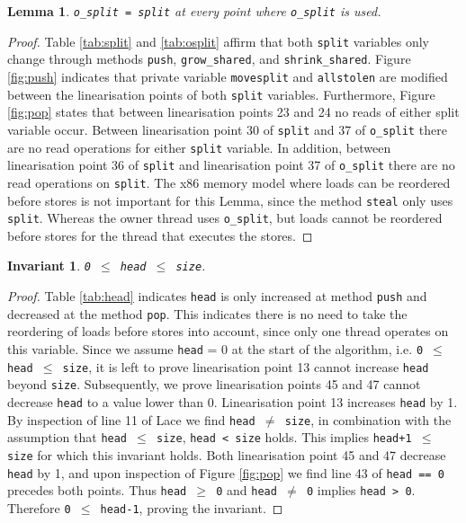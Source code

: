 \documentclass{sig-alternate-br}
\newtheorem{lemma}{Lemma}
\newtheorem{invariant}{Invariant}
\begin{document}
\begin{lemma}
	\texttt{o\_split = split} at every point where \texttt{o\_split} is used.
	\label{lem:split}
\end{lemma}
\begin{proof}
	Table \ref{tab:split} and \ref{tab:osplit} affirm that both \texttt{split} variables only change through methods \texttt{push}, \texttt{grow\_shared}, and \texttt{shrink\_shared}.
	Figure \ref{fig:push} indicates that private variable \texttt{movesplit} and \texttt{allstolen} are modified between the linearisation points of both \texttt{split} variables.
	Furthermore, Figure \ref{fig:pop} states that between linearisation points 23 and 24 no reads of either split variable occur.
	Between linearisation point 30 of \texttt{split} and 37 of \texttt{o\_split} there are no read operations for either \texttt{split} variable.
	In addition, between linearisation point 36 of \texttt{split} and linearisation point 37 of \texttt{o\_split} there are no read operations on \texttt{split}.	
	The x86 memory model where loads can be reordered before stores is not important for this Lemma, since the method \texttt{steal} only uses \texttt{split}.
	Whereas the owner thread uses \texttt{o\_split}, but loads cannot be reordered before stores for the thread that executes the stores.		
\end{proof}

\begin{invariant}
	\texttt{0 $\leq$ head $\leq$ size}.
	\label{lem:headsize}
\end{invariant}
\begin{proof}
	Table \ref{tab:head} indicates \texttt{head} is only increased at method \texttt{push} and decreased at the method \texttt{pop}.
	This indicates there is no need to take the reordering of loads before stores into account, since only one thread operates on this variable.
	Since we assume \texttt{head} = 0 at the start of the algorithm, i.e. \texttt{0 $\leq$ head $\leq$ size}, it is left to prove linearisation point 13 cannot increase \texttt{head} beyond \texttt{size}.
	Subsequently, we prove linearisation points 45 and 47 cannot decrease \texttt{head} to a value lower than 0.
	Linearisation point 13 increases \texttt{head} by 1.
	By inspection of line 11 of Lace we find \texttt{head $\neq$ size}, in combination with the assumption that \texttt{head $\leq$ size}, \texttt{head < size} holds.
	This implies \texttt{head+1 $\leq$ size} for which this invariant holds.
	Both linearisation point 45 and 47 decrease \texttt{head} by 1, and upon inspection of Figure \ref{fig:pop} we find line 43 of \texttt{head == 0} precedes both points.
	Thus \texttt{head $\geq$ 0} and \texttt{head $\neq$ 0} implies \texttt{head > 0}.
	Therefore \texttt{0 $\leq$ head-1}, proving the invariant.
\end{proof}
\end{document}
